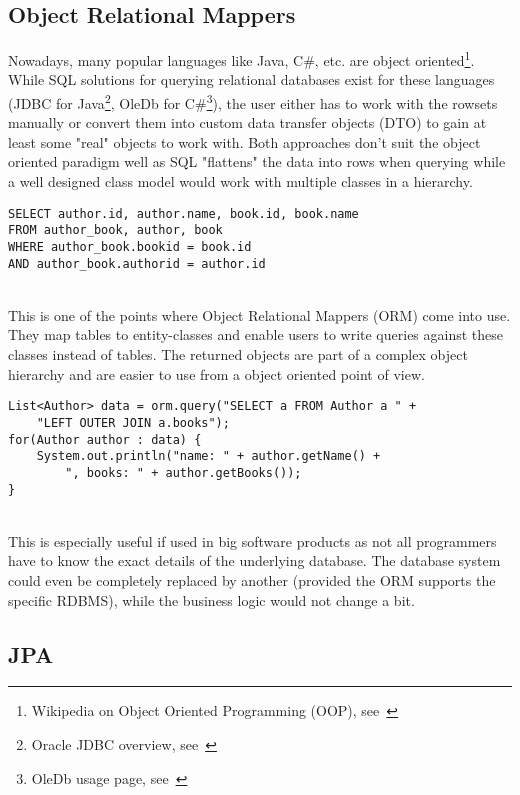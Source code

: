 \subsection{Object Relational Mappers}
Nowadays, many popular languages like Java, C\#, etc. are object oriented\footnote{Wikipedia on Object Oriented Programming (OOP), see~\cite{object_oriented_programming_wiki}}.
While SQL solutions for querying relational databases exist for these languages (JDBC for Java\footnote{Oracle JDBC overview, see~\cite{jdbc_oracle}}, OleDb for C\#\footnote{OleDb usage page, see~\cite{oledb_ms}}), the user either has to work with the rowsets manually or convert them into custom data transfer objects (DTO) to gain at least some "real" objects to work with. Both approaches don't suit the object oriented paradigm well as SQL "flattens" the data into rows when querying while a well designed class model would work with multiple classes in a hierarchy.
\\
\lstset{language=sql}
\begin{lstlisting}[frame=htrbl, caption={SQL "flattening" the author and book table into rows}, label={lst:flattening.sql}]
SELECT author.id, author.name, book.id, book.name 
FROM author_book, author, book
WHERE author_book.bookid = book.id
AND author_book.authorid = author.id
\end{lstlisting}
~\\
This is one of the points where Object Relational Mappers (ORM) come into use. They map tables to entity-classes and
enable users to write queries against these classes instead of tables. The returned objects are part of a complex object hierarchy and are easier to use from a object oriented point of view.
\\
\lstset{language=java}
\begin{lstlisting}[frame=htrbl, caption={ORM query example}, label={lst:flattening.sql}]
List<Author> data = orm.query("SELECT a FROM Author a " +
	"LEFT OUTER JOIN a.books");
for(Author author : data) {
	System.out.println("name: " + author.getName() + 
		", books: " + author.getBooks());
}
\end{lstlisting}
~\\
This is especially useful if used in big software products as not all programmers have to know the exact details of the underlying database. The database system could even be completely replaced by another (provided the ORM supports the specific RDBMS), while the business logic would not change a bit.

\subsection{JPA}

